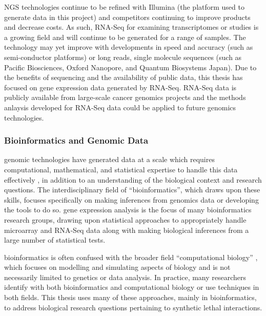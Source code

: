 \Gls{NGS} technologies continue to be refined \citep{Goodwin2016} with Illumina (the platform used to generate data in this project) and competitors continuing to improve products and decrease costs. As such, \gls{RNA-Seq} for examining \glspl{transcriptome} or  studies is a growing field and will continue to be generated for a range of samples. The technology may yet improve \citep{Goodwin2016} with developments in speed and accuracy (such as semi-conductor platforms) or long reads, single molecule sequences (such as Pacific Biosciences, Oxford Nanopore, and Quantum Biosystems Japan).    
Due to the benefits of sequencing and the availability of public data, this thesis has focused on \gls{gene expression} data generated by \gls{RNA-Seq}. \gls{RNA-Seq} data is publicly available from large-scale cancer \glspl{genomic} projects and the methods anlaysis developed for \gls{RNA-Seq} data could be applied to future \glspl{genomic} technologies.


\subsubsection{Bioinformatics and Genomic Data}
\Gls{genomic} technologies have generated data at a scale which requires computational, mathematical, and statistical expertise to handle this data effectively \citep{Markowetz2017, Tran2012}, in addition to an understanding of the biological context and research questions. The interdisciplinary field of ``\gls{bioinformatics}'', which draws upon these skills, focuses specifically on making inferences from \glspl{genomic} data or developing the tools to do so. \Gls{gene expression} analysis is the focus of many \gls{bioinformatics} research groups, drawing upon statistical approaches to appropriately handle \gls{microarray} and \gls{RNA-Seq} data along with making biological inferences from a large number of statistical tests.

\Gls{bioinformatics} is often confused with the broader field ``\gls{computational biology}'' \citep{Markowetz2017}, which focuses on modelling and simulating aspects of biology and is not necessarily limited to genetics or data analysis. In practice, many researchers identify with both \gls{bioinformatics} and \gls{computational biology} or use techniques in both fields. This thesis uses many of these approaches, mainly in \gls{bioinformatics}, to address biological research questions pertaining to \gls{synthetic lethal} interactions.

